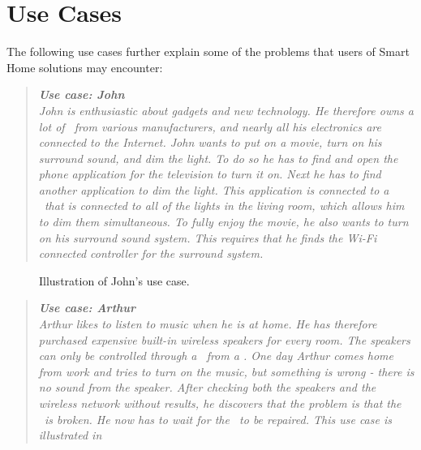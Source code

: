 \section{Use Cases}\label{sec:use-cases}

The following use cases further explain some of the problems that users of Smart Home solutions may encounter: 

\begin{quotation}\emph{\textbf{Use case: John}\\
John is enthusiastic about gadgets and new technology. He therefore owns a lot of \sdevs~from various manufacturers, and nearly all his electronics are connected to the Internet. John wants to put on a movie, turn on his surround sound, and dim the light. To do so he has to find and open the phone application for the television to turn it on. Next he has to find another application to dim the light. This application is connected to a \hub~that is connected to all of the lights in the living room, which allows him to dim them simultaneous. To fully enjoy the movie, he also wants to turn on his surround sound system. This requires that he finds the Wi-Fi connected controller for the surround system.}
\end{quotation}

\begin{figure}[H]
     \caption{\label{fig:use-case-1} Illustration of John's use case.}
\end{figure}

\begin{quotation}\emph{\textbf{Use case: Arthur}\\
Arthur likes to listen to music when he is at home. He has therefore purchased expensive built-in wireless speakers for every room. The speakers can only be controlled through a \hub~from a \phone. One day Arthur comes home from work and tries to turn on the music, but something is wrong - there is no sound from the speaker. After checking both the speakers and the wireless network without results, he discovers that the problem is that the \hub~is broken. He now has to wait for the \hub~to be repaired. This use case is illustrated in }
\end{quotation}

